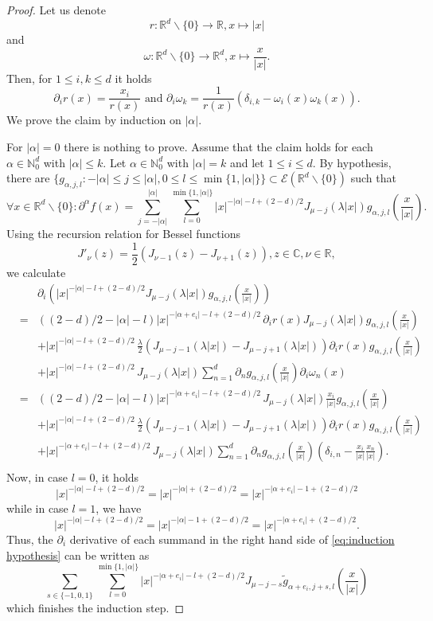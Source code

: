 \documentclass[a4paper,10pt]{amsart}
\newtheorem*{crucial lemma}{Lemma \ref{lem:nice polynomial2}}
\theoremstyle{definition}
\newcommand{\R}{\mathbb{R}}
\newcommand{\C}{\mathbb{C}}
\newcommand{\N}{\mathbb{N}}
\begin{document}
\begin{proof}
	Let us denote
	\[r:\R^d\backslash\{0\}\rightarrow\R, x\mapsto |x|\]
	and
	\[\omega:\R^d\backslash\{0\}\rightarrow\R^d, x\mapsto\frac{x}{|x|}.\]
	Then, for $1\leq i,k\leq d$ it holds
	\[\partial_i r(x)=\frac{x_i}{r(x)}\text{ and }\partial_i\omega_k=\frac{1}{r(x)}\left(\delta_{i,k}-\omega_i(x)\omega_k(x)\right).\]
	We prove the claim by induction on $|\alpha|$.
	
	For $|\alpha|=0$ there is nothing to prove. Assume that the claim holds for each $\alpha\in \N_0^d$ with $|\alpha|\leq k$.  Let $\alpha\in\N_0^d$ with $|\alpha|=k$ and let $1\leq i\leq d$. By hypothesis, there are $\{g_{\alpha,j,l}\colon -|\alpha|\leq j\leq |\alpha|, 0\leq l\leq \min\{1,|\alpha|\}\}\subset \mathscr{E}(\R^d\backslash\{0\})$ such that
	\begin{equation}\label{eq:induction hypothesis}
		\forall x\in\R^d\backslash\{0\}\colon \partial^\alpha f(x)=\sum_{j=-|\alpha|}^{|\alpha|}\sum_{l=0}^{\min\{1,|\alpha|\}} |x|^{-|\alpha|-l+(2-d)/2}J_{\mu-j}(\lambda|x|)g_{\alpha,j,l}\left(\frac{x}{|x|}\right).
	\end{equation}
	Using the recursion relation for Bessel functions 
	\[J'_\nu(z)=\frac{1}{2}(J_{\nu-1}(z)-J_{\nu+1}(z)), z\in\C, \nu\in\R,\]
	we calculate
	\begin{eqnarray*}
		&&\partial_i\left(|x|^{-|\alpha|-l+(2-d)/2}J_{\mu-j}(\lambda |x|)g_{\alpha,j,l}\left(\frac{x}{|x|}\right)\right)\\
		&=&((2-d)/2-|\alpha|-l)|x|^{-|\alpha+e_i|-l+(2-d)/2}\,\partial_i r(x) J_{\mu-j}(\lambda|x|)g_{\alpha,j,l}\left(\frac{x}{|x|}\right)\\
		&&+|x|^{-|\alpha|-l+(2-d)/2}\,\frac{\lambda}{2}\left(J_{\mu-j-1}(\lambda|x|)-J_{\mu-j+1}(\lambda|x|)\right)\partial_i r(x) g_{\alpha,j,l}\left(\frac{x}{|x|}\right)\\
		&&+|x|^{-|\alpha|-l+(2-d)/2}\,J_{\mu-j}(\lambda|x|)\sum_{n=1}^d\partial_n g_{\alpha,j,l}\left(\frac{x}{|x|}\right)\partial_i\omega_n(x)\\
		&=&((2-d)/2-|\alpha|-l)|x|^{-|\alpha+e_i|-l+(2-d)/2}\, J_{\mu-j}(\lambda|x|) \frac{x_i}{|x|}g_{\alpha,j,l}\left(\frac{x}{|x|}\right)\\
		&&+|x|^{-|\alpha|-l+(2-d)/2}\,\frac{\lambda}{2}\left(J_{\mu-j-1}(\lambda|x|)-J_{\mu-j+1}(\lambda|x|)\right)\partial_i r(x) g_{\alpha,j,l}\left(\frac{x}{|x|}\right)\\
		&&+|x|^{-|\alpha+e_i|-l+(2-d)/2}\,J_{\mu-j}(\lambda|x|)\sum_{n=1}^d\partial_n g_{\alpha,j,l}\left(\frac{x}{|x|}\right)\left(\delta_{i,n}-\frac{x_i}{|x|}\frac{x_n}{|x|}\right).\\ 
	\end{eqnarray*}
	Now, in case $l=0$, it holds
	\[|x|^{-|\alpha|-l+(2-d)/2}=|x|^{-|\alpha|+(2-d)/2}=|x|^{-|\alpha+e_i|-1+(2-d)/2}\]
	while in case $l=1$, we have
	\[|x|^{-|\alpha|-l+(2-d)/2}=|x|^{-|\alpha|-1+(2-d)/2}=|x|^{-|\alpha+e_i|+(2-d)/2}.\]
	Thus, the $\partial_i$ derivative of each summand in the right hand side of \eqref{eq:induction hypothesis} can be written as
	\[\sum_{s\in\{-1,0,1\}}\sum_{l=0}^{\min\{1,|\alpha|\}}|x|^{-|\alpha+e_i|-l+(2-d)/2}J_{\mu-j-s}\tilde{g}_{\alpha+e_i,j+s,l}\left(\frac{x}{|x|}\right)\]
	which finishes the induction step.
\end{proof}
\end{document}
